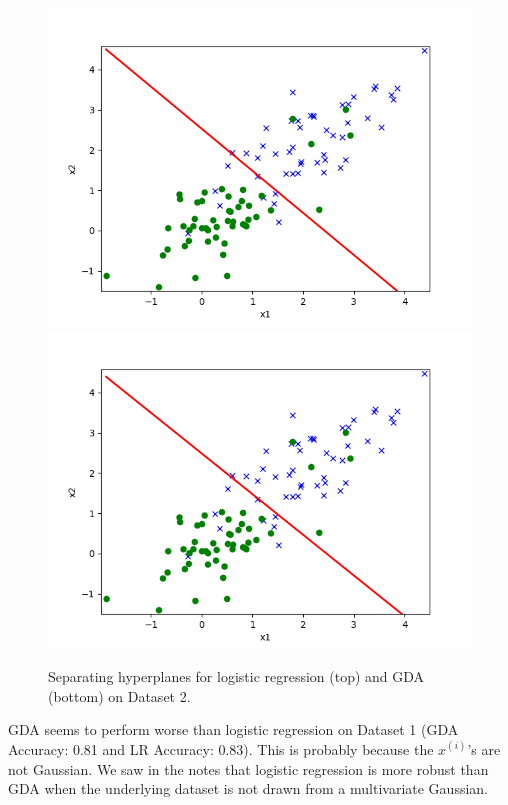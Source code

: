 \begin{answer}
	\begin{figure}[H]
		\centering
		\vspace{2mm}
		\includegraphics[width=0.65\linewidth]{../src/linearclass/logreg_pred_2.png}
		\centering
		\vspace{2mm}
		\includegraphics[width=0.65\linewidth]{../src/linearclass/gda_pred_2.png}
		\caption{Separating hyperplanes for logistic regression (top)
		and GDA (bottom) on Dataset 2.}
	\end{figure}

	GDA seems to perform worse than logistic regression on Dataset 1
	(GDA Accuracy: 0.81 and LR Accuracy: 0.83).
	This is probably because the $x^{(i)}$'s are not Gaussian. We
	saw in the notes that logistic regression is more robust than GDA
	when the underlying dataset is not drawn from a multivariate Gaussian.
\end{answer}
